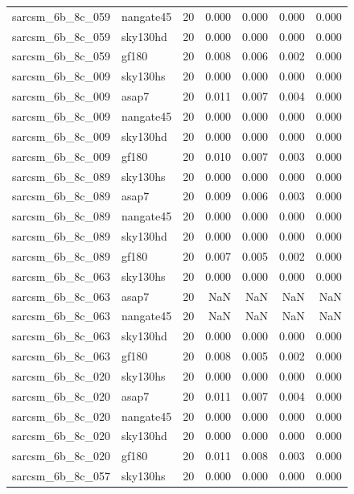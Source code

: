 \begin{tabular}{llrrrrr}
sarcsm\_6b\_8c\_059 & nangate45 & 20 & 0.000 & 0.000 & 0.000 & 0.000 \\
sarcsm\_6b\_8c\_059 & sky130hd & 20 & 0.000 & 0.000 & 0.000 & 0.000 \\
sarcsm\_6b\_8c\_059 & gf180 & 20 & 0.008 & 0.006 & 0.002 & 0.000 \\
sarcsm\_6b\_8c\_009 & sky130hs & 20 & 0.000 & 0.000 & 0.000 & 0.000 \\
sarcsm\_6b\_8c\_009 & asap7 & 20 & 0.011 & 0.007 & 0.004 & 0.000 \\
sarcsm\_6b\_8c\_009 & nangate45 & 20 & 0.000 & 0.000 & 0.000 & 0.000 \\
sarcsm\_6b\_8c\_009 & sky130hd & 20 & 0.000 & 0.000 & 0.000 & 0.000 \\
sarcsm\_6b\_8c\_009 & gf180 & 20 & 0.010 & 0.007 & 0.003 & 0.000 \\
sarcsm\_6b\_8c\_089 & sky130hs & 20 & 0.000 & 0.000 & 0.000 & 0.000 \\
sarcsm\_6b\_8c\_089 & asap7 & 20 & 0.009 & 0.006 & 0.003 & 0.000 \\
sarcsm\_6b\_8c\_089 & nangate45 & 20 & 0.000 & 0.000 & 0.000 & 0.000 \\
sarcsm\_6b\_8c\_089 & sky130hd & 20 & 0.000 & 0.000 & 0.000 & 0.000 \\
sarcsm\_6b\_8c\_089 & gf180 & 20 & 0.007 & 0.005 & 0.002 & 0.000 \\
sarcsm\_6b\_8c\_063 & sky130hs & 20 & 0.000 & 0.000 & 0.000 & 0.000 \\
sarcsm\_6b\_8c\_063 & asap7 & 20 & NaN & NaN & NaN & NaN \\
sarcsm\_6b\_8c\_063 & nangate45 & 20 & NaN & NaN & NaN & NaN \\
sarcsm\_6b\_8c\_063 & sky130hd & 20 & 0.000 & 0.000 & 0.000 & 0.000 \\
sarcsm\_6b\_8c\_063 & gf180 & 20 & 0.008 & 0.005 & 0.002 & 0.000 \\
sarcsm\_6b\_8c\_020 & sky130hs & 20 & 0.000 & 0.000 & 0.000 & 0.000 \\
sarcsm\_6b\_8c\_020 & asap7 & 20 & 0.011 & 0.007 & 0.004 & 0.000 \\
sarcsm\_6b\_8c\_020 & nangate45 & 20 & 0.000 & 0.000 & 0.000 & 0.000 \\
sarcsm\_6b\_8c\_020 & sky130hd & 20 & 0.000 & 0.000 & 0.000 & 0.000 \\
sarcsm\_6b\_8c\_020 & gf180 & 20 & 0.011 & 0.008 & 0.003 & 0.000 \\
sarcsm\_6b\_8c\_057 & sky130hs & 20 & 0.000 & 0.000 & 0.000 & 0.000 \\

\end{tabular}
